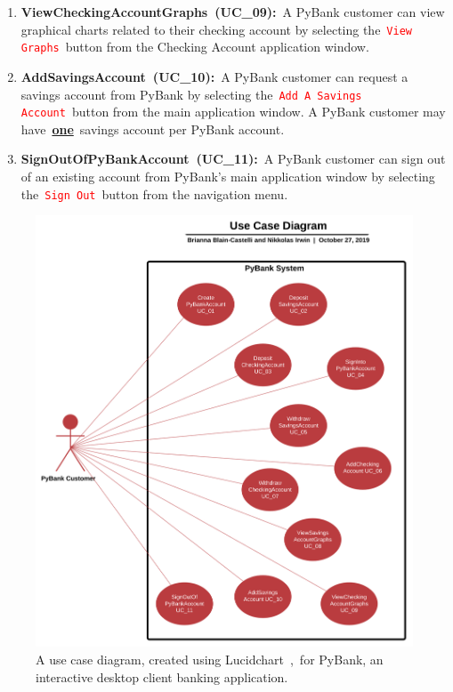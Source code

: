 \begin{enumerate}[itemsep=1mm, parsep=0pt]
    \item {\textbf{ViewCheckingAccountGraphs~(UC\_09):}~A PyBank customer can view graphical charts related to their checking account by selecting the~\texttt{\textcolor{red}{View Graphs}}~button from the Checking Account application window.}
    \item {\textbf{AddSavingsAccount~(UC\_10):}~A PyBank customer can request a savings account from PyBank by selecting the~\texttt{\textcolor{red}{Add A Savings Account}}~button from the main application window. A PyBank customer may have~\textbf{\underline{one}}~savings account per PyBank account.}
    \item {\textbf{SignOutOfPyBankAccount~(UC\_11):}~A PyBank customer can sign out of an existing account from PyBank's main application window by selecting the~\texttt{\textcolor{red}{Sign Out}}~button from the navigation menu.}
\end{enumerate}

\newpage

\begin{figure}[H]
	\begin{centering}
	\includegraphics[width=1.00\linewidth, height=1.10\linewidth]{diagrams/use_case_diagram.png}
	\caption{A use case diagram, created using Lucidchart~\cite{LUCID_CHART:5},~for PyBank, an interactive desktop client banking application.}
	\label{fig:use_case}
	\end{centering}
\end{figure}


